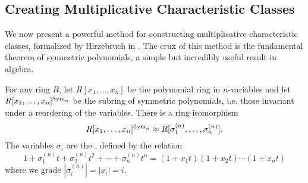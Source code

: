 %
%
%
%

\subsection{Creating Multiplicative Characteristic Classes}

We now present a powerful method for constructing multiplicative characteristic classes, formalized by Hirzebruch in \cite{hirzebruch1966methods}.
The crux of this method is the fundamental theorem of symmetric polynomials, a simple but incredibly useful result in algebra.

\begin{theorem}
	For any ring $R$, let $R[x_1,\ldots, x_n]$ be the polynomial ring in $n$-variables and let $R[x_1,\ldots, x_n]^{\mathrm{Sym}_n}$ be the subring of symmetric polynomials, i.e. those invariant under a reordering of the variables. There is a ring isomorphism
	\[
		R[x_1,\ldots, x_n]^{\mathrm{Sym}_n} \approx R[\sigma_1^{(n)},\ldots, \sigma_n^{(n)}].
	\]
	The variables $\sigma_i$ are the , defined by the relation
	\begin{equation}\label{eq:symmetric-polynomials}
		1+\sigma_1^{(n)}t+\sigma_2^{(n)}t^2+\cdots+\sigma_n^{(n)}t^n = (1+x_1t)(1+x_2t)\cdots (1+x_nt)
	\end{equation}
	where we grade $|\sigma_i^{(n)}|=|x_i|=i$.
\end{theorem}

